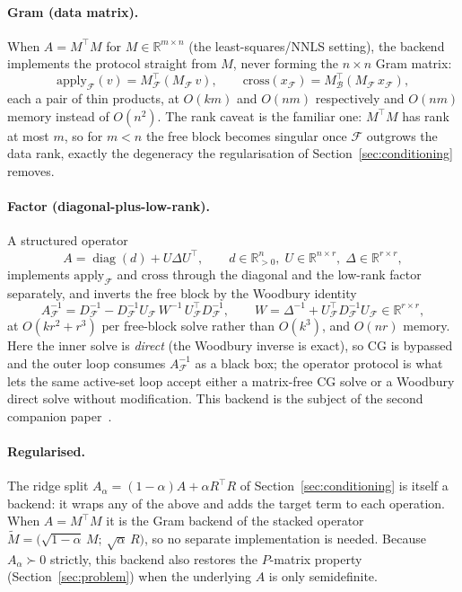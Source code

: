 \paragraph{Gram (data matrix).}
When $A = M^\top M$ for $M \in \mathbb{R}^{m\times n}$ (the least-squares/NNLS setting), the
backend implements the protocol straight from $M$, never forming the $n\times n$ Gram matrix:
\[
  \mathrm{apply}_{\mathcal{F}}(v) = M_{\mathcal{F}}^\top\!\left(M_{\mathcal{F}}\,v\right),
  \qquad
  \mathrm{cross}(x_{\mathcal{F}}) = M_{\mathcal{B}}^\top\!\left(M_{\mathcal{F}}\,x_{\mathcal{F}}\right),
\]
each a pair of thin products, at $O(km)$ and $O(nm)$ respectively and $O(nm)$ memory instead of
$O(n^2)$. The rank caveat is the familiar one: $M^\top M$ has rank at most $m$, so for $m < n$
the free block becomes singular once $\mathcal{F}$ outgrows the data rank, exactly the
degeneracy the regularisation of Section~\ref{sec:conditioning} removes.

\paragraph{Factor (diagonal-plus-low-rank).}
A structured operator
\[
  A = \operatorname{diag}(d) + U\Delta U^\top,
  \qquad d \in \mathbb{R}^n_{>0},\; U \in \mathbb{R}^{n\times r},\; \Delta \in \mathbb{R}^{r\times r},
\]
implements $\mathrm{apply}_{\mathcal{F}}$ and $\mathrm{cross}$ through the diagonal and the
low-rank factor separately, and inverts the free block by the Woodbury identity
\[
  A_{\mathcal{F}}^{-1} = D_{\mathcal{F}}^{-1}
    - D_{\mathcal{F}}^{-1} U_{\mathcal{F}}\, W^{-1}\, U_{\mathcal{F}}^\top D_{\mathcal{F}}^{-1},
  \qquad W = \Delta^{-1} + U_{\mathcal{F}}^\top D_{\mathcal{F}}^{-1} U_{\mathcal{F}} \in \mathbb{R}^{r\times r},
\]
at $O(k r^2 + r^3)$ per free-block solve rather than $O(k^3)$, and $O(nr)$ memory. Here the
inner solve is \emph{direct} (the Woodbury inverse is exact), so CG is bypassed and the outer
loop consumes $A_{\mathcal{F}}^{-1}$ as a black box; the operator protocol is what lets the same
active-set loop accept either a matrix-free CG solve or a Woodbury direct solve without
modification. This backend is the subject of the second companion paper~\cite{schmelzer2026rmt}.

\paragraph{Regularised.}
The ridge split $A_\alpha = (1-\alpha)A + \alpha R^\top R$ of Section~\ref{sec:conditioning} is
itself a backend: it wraps any of the above and adds the target term to each operation. When
$A = M^\top M$ it is the Gram backend of the stacked operator
$\tilde M = \big(\sqrt{1-\alpha}\,M;\ \sqrt{\alpha}\,R\big)$, so no separate implementation is
needed. Because $A_\alpha \succ 0$ strictly, this backend also restores the $P$-matrix property
(Section~\ref{sec:problem}) when the underlying $A$ is only semidefinite.


